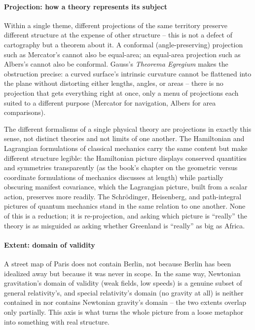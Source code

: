 \paragraph{Projection: how a theory represents its subject}

Within a single theme, different projections of the same territory preserve
different structure at the expense of other structure -- this is not a defect
of cartography but a theorem about it. A conformal (angle-preserving)
projection such as Mercator's cannot also be equal-area; an equal-area
projection such as Albers's cannot also be conformal. Gauss's \emph{Theorema
Egregium} makes the obstruction precise: a curved surface's intrinsic curvature
cannot be flattened into the plane without distorting either lengths, angles,
or areas -- there is no projection that gets everything right at once, only a
menu of projections each suited to a different purpose (Mercator for
navigation, Albers for area comparisons).

The different formalisms of a single physical theory are projections in exactly
this sense, not distinct theories and not limits of one another. The
Hamiltonian and Lagrangian formulations of classical mechanics carry the same
content but make different structure legible: the Hamiltonian picture displays
conserved quantities and symmetries transparently (as the book's chapter on the
geometric versus coordinate formulations of mechanics discusses at length)
while partially obscuring manifest covariance, which the Lagrangian picture,
built from a scalar action, preserves more readily. The Schr\"odinger,
Heisenberg, and path-integral pictures of quantum mechanics stand in the same
relation to one another. None of this is a reduction; it is re-projection, and
asking which picture is ``really'' the theory is as misguided as asking whether
Greenland is ``really'' as big as Africa.

\paragraph{Extent: domain of validity}

A street map of Paris does not contain Berlin, not because Berlin has been
idealized away but because it was never in scope. In the same way, Newtonian
gravitation's domain of validity (weak fields, low speeds) is a genuine subset
of general relativity's, and special relativity's domain (no gravity at all) is
neither contained in nor contains Newtonian gravity's domain -- the two extents
overlap only partially. This axis is what turns the whole picture from a loose
metaphor into something with real structure. 

